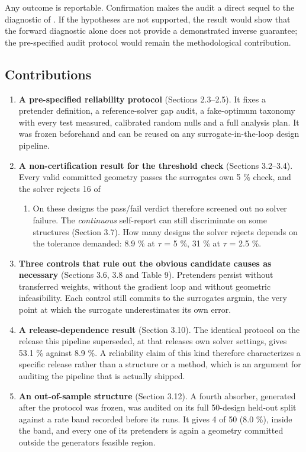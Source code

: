 \documentclass[11pt,a4paper]{article}
\providecommand{\tightlist}{\setlength{\itemsep}{0pt}\setlength{\parskip}{0pt}}
\begin{document}
Any outcome is reportable. Confirmation makes the audit a direct sequel to the diagnostic
of \cite{choi20261}. If the hypotheses are not supported, the result would show that the forward diagnostic alone does not provide a demonstrated inverse guarantee; the pre-specified audit protocol would remain the methodological contribution.

\subsection{Contributions}\label{sec:1.5}

\begin{enumerate}
\def\labelenumi{\arabic{enumi}.}
\tightlist
\item
  \textbf{A pre-specified reliability protocol} (Sections 2.3--2.5). It fixes a pretender
  definition, a reference-solver gap audit, a fake-optimum taxonomy with every test
  measured, calibrated random nulls and a full analysis plan. It was frozen beforehand
  and can be reused on any surrogate-in-the-loop design pipeline.
\item
  \textbf{A non-certification result for the threshold check} (Sections 3.2--3.4). Every valid
  committed geometry passes the surrogate\textquotesingle s own 5 \% check, and the solver rejects 16 of

  \begin{enumerate}
  \def\labelenumii{\arabic{enumii}.}
  \setcounter{enumii}{178}
  \tightlist
  \item
    On these designs the pass/fail verdict therefore screened out no solver failure.
    The \emph{continuous} self-report can still discriminate on some structures (Section 3.7).
    How many designs the solver rejects depends on the tolerance demanded: 8.9 \% at
    \ensuremath{\tau} = 5 \%, 31 \% at \ensuremath{\tau} = 2.5 \%.
  \end{enumerate}
\item
  \textbf{Three controls that rule out the obvious candidate causes as necessary} (Sections 3.6, 3.8 and Table 9). Pretenders persist without transferred weights, without the gradient
  loop and without geometric infeasibility. Each control still commits to the surrogate\textquotesingle s argmin, the very point at which the surrogate underestimates its own error.
\item
  \textbf{A release-dependence result} (Section 3.10). The identical protocol on the release this pipeline superseded, at that release\textquotesingle s own solver settings, gives 53.1 \% against 8.9 \%.
  A reliability claim of this kind therefore characterizes a specific release rather than a structure or a method, which is an argument for auditing the pipeline that is actually shipped.
\item
  \textbf{An out-of-sample structure} (Section 3.12). A fourth absorber, generated after the
  protocol was frozen, was audited on its full 50-design held-out split against a rate
  band recorded before its runs. It gives 4 of 50 (8.0 \%), inside the band, and every one
  of its pretenders is again a geometry committed outside the generator\textquotesingle s feasible region.
\end{enumerate}
\end{document}
